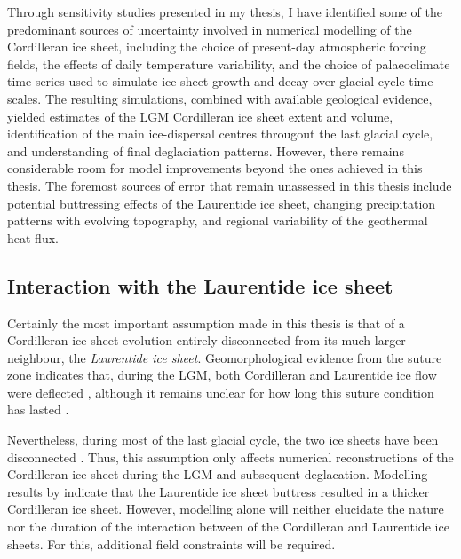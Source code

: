 \documentclass{article}
\begin{document}
Through sensitivity studies presented in my thesis, I have identified some of
the predominant sources of uncertainty involved in numerical modelling of the
Cordilleran ice sheet, including the choice of present-day atmospheric forcing
fields, the effects of daily temperature variability, and the choice of
palaeoclimate time series used to simulate ice sheet growth and decay over
glacial cycle
time scales. The resulting simulations, combined with available geological
evidence, yielded estimates of the LGM Cordilleran ice sheet extent and volume,
identification of the main ice-dispersal centres througout the last glacial
cycle, and understanding of final deglaciation patterns. However, there remains
considerable room for model improvements beyond the ones achieved in this
thesis. The foremost sources of error that remain unassessed in this thesis
include potential buttressing effects of the Laurentide ice sheet, changing
precipitation patterns with evolving topography, and regional variability of
the geothermal heat flux.


\subsection{Interaction with the Laurentide ice sheet}

Certainly the most important assumption made in this thesis is that of a
Cordilleran ice sheet evolution entirely disconnected from its much larger
neighbour, the \emph{Laurentide ice sheet}. Geomorphological evidence from the
suture zone indicates that, during the LGM, both Cordilleran and Laurentide ice
flow were deflected \citep{Kleman.etal.2010, Margold.etal.2013,
Margold.etal.2013a}, although it remains unclear for how long this suture
condition has lasted \citep{Jackson.etal.1997, Bednarski.Smith.2007,
Gowan.2013}.

Nevertheless, during most of the last glacial cycle, the two ice sheets have
been disconnected \citep{Kleman.etal.2010}. Thus, this assumption only affects
numerical reconstructions of the Cordilleran ice sheet during the LGM and
subsequent deglacation. Modelling results by \citet{Gregoire.etal.2012}
indicate that the Laurentide ice sheet buttress resulted in a thicker
Cordilleran ice sheet. However, modelling alone will neither elucidate the
nature nor the duration of the interaction between of the Cordilleran and
Laurentide ice sheets. For this, additional field constraints will be required.
\end{document}
